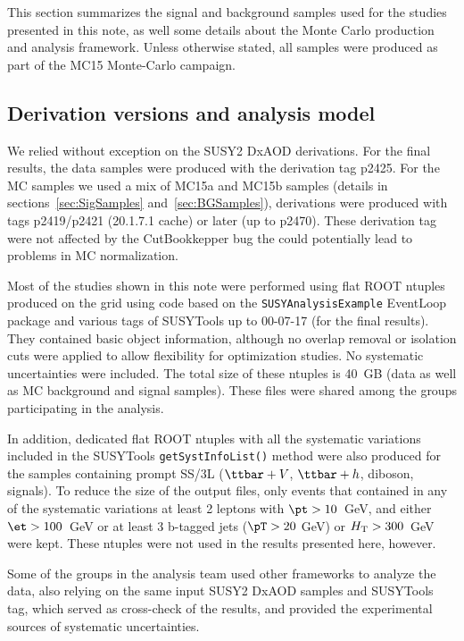
This section summarizes the signal and background samples used for the
studies presented in this note, as well some details about the Monte Carlo production and analysis framework.
Unless otherwise stated, all samples were produced as part of the MC15 Monte-Carlo campaign. 

\subsection{Derivation versions and analysis model}
\label{sec:ntuples}

We relied without exception on the SUSY2 DxAOD derivations. 
For the final results, the data samples were produced with the derivation tag p2425. 
For the MC samples we used a mix of MC15a and MC15b samples (details in sections~\ref{sec:SigSamples} and~\ref{sec:BGSamples}), 
derivations were produced with tags p2419/p2421 (20.1.7.1 cache) or later (up to p2470).  
These derivation tag were not affected by the CutBookkepper bug the could potentially lead to problems in MC normalization.

Most of the studies shown in this note were performed using flat ROOT ntuples produced on the grid 
using code based on the {\tt{SUSYAnalysisExample}} EventLoop package 
and various tags of SUSYTools up to 00-07-17 (for the final results). 
They contained basic object information, although no overlap removal 
or isolation cuts were applied to allow flexibility for optimization studies. 
No systematic uncertainties were included. 
The total size of these ntuples is 40~GB (data as well as MC background and signal samples).
These files were shared among the groups participating in the analysis. 

In addition, dedicated flat ROOT ntuples with all the systematic variations included in the SUSYTools {\tt getSystInfoList()} method 
were also produced for the samples containing prompt SS/3L ($\ttbar+V$, $\ttbar+h$, diboson, signals). 
To reduce the size of the output files, only events that contained in any of the systematic variations
at least 2 leptons with $\pt>10$~GeV, and either $\et>100$~GeV or at least 3 b-tagged jets ($\pT>20$ GeV) or $H_{\rm T}>300$~GeV were kept. 
These ntuples were not used in the results presented here, however. 

Some of the groups in the analysis team used other frameworks to analyze the data, 
also relying on the same input SUSY2 DxAOD samples and SUSYTools tag, which served as cross-check of the results, 
and provided the experimental sources of systematic uncertainties. 



